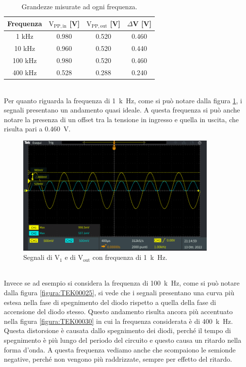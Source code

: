 \documentclass{report}
\begin{document}
\begin{table}[h!]
	\centering
	\begin{tabular}{|c|c|c|c|}
		\hline
		\textbf{Frequenza} & \boldmath$\displaystyle\mathrm{V_{PP,in}}$\textbf{ [V]} & \boldmath$\displaystyle\mathrm{{V_{PP,out}}}$\textbf{ [V]} & \boldmath$\Delta$\textbf{V [V]}\\
		\hline
		1 kHz & 0.980 & 0.520 & 0.460\\
		\hline
		10 kHz & 0.960 & 0.520 & 0.440\\
		\hline
		100 kHz & 0.980 & 0.520 & 0.460\\
		\hline
		400 kHz & 0.528 & 0.288 & 0.240\\
		\hline\end{tabular}
	\caption{Grandezze misurate ad ogni frequenza.}
	\label{table:misure3}
\end{table}
\\Per quanto riguarda la frequenza di \SI{1}{k\hertz}, come si può notare dalla figura \ref{figura:TEK00022}, i segnali presentano un andamento quasi ideale. A questa frequenza si può anche notare la presenza di un offset tra la tensione in ingresso e quella in uscita, che risulta pari a \SI{0.460}{\volt}.
\begin{figure}[h!]
	\centering
	\includegraphics[height=6cm]{immagini/TEK00022}
	\caption{Segnali di $\mathrm{V_1}$ e di $\mathrm{V_{out}}$ con frequenza di \SI{1}{k\hertz}.}
	\label{figura:TEK00022}
\end{figure}
\\Invece se ad esempio si considera la frequenza di \SI{100}{k\hertz}, come si può notare dalla figura \ref{figura:TEK00025}, si vede che i segnali presentano una curva più estesa nella fase di spegnimento del diodo rispetto a quella della fase di accensione del diodo stesso. Questo andamento risulta ancora più accentuato nella figura \ref{figura:TEK00030} in cui la frequenza considerata è di \SI{400}{k\hertz}. Questa distorsione è causata dallo spegnimento dei diodi, perché il tempo di spegnimento è più lungo del periodo del circuito e questo causa un ritardo nella forma d'onda. A questa frequenza vediamo anche che scompaiono le semionde negative, perché non vengono più raddrizzate, sempre per effetto del ritardo.
\end{document}
